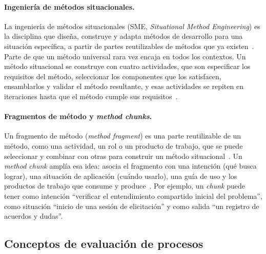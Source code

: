\documentclass[12pt,letterpaper,oneside]{report}
\begin{document}
\paragraph{Ingeniería de métodos situacionales.}
La ingeniería de métodos situacionales (SME, \textit{Situational Method
Engineering}) es la disciplina que diseña, construye y adapta métodos de
desarrollo para una situación específica, a partir de partes reutilizables de
métodos que ya existen~\cite{brinkkemper1996method,henderson2010sme}. Parte de
que un método universal rara vez encaja en todos los contextos. Un método
situacional se construye con cuatro actividades, que son especificar los
requisitos del método, seleccionar los componentes que los satisfacen,
ensamblarlos y validar el método resultante, y esas actividades se repiten en iteraciones 
hasta que el método cumple sus
requisitos~\cite{ralyte2001assembly,henderson2014}.

\paragraph{Fragmentos de método y \textit{method chunks}.}
Un fragmento de método (\textit{method fragment}) es una parte reutilizable de un
método, como una actividad, un rol o un producto de trabajo, que se puede
seleccionar y combinar con otras para construir un método
situacional~\cite{harmsen1995}. Un \textit{method chunk} amplía esa idea: asocia el fragmento con una intención (qué busca lograr), una situación de
aplicación (cuándo usarlo), una guía de uso y los productos de trabajo que
consume y produce~\cite{ralyte2001assembly,mirbel2006sme}. Por ejemplo, un
\textit{chunk} puede tener como intención ``verificar el entendimiento compartido inicial
del problema'', como situación ``inicio de una sesión de elicitación'' y como
salida ``un registro de acuerdos y dudas''.


\subsection{Conceptos de evaluación de procesos}
\label{sec:marco_evaluacion}
\end{document}
